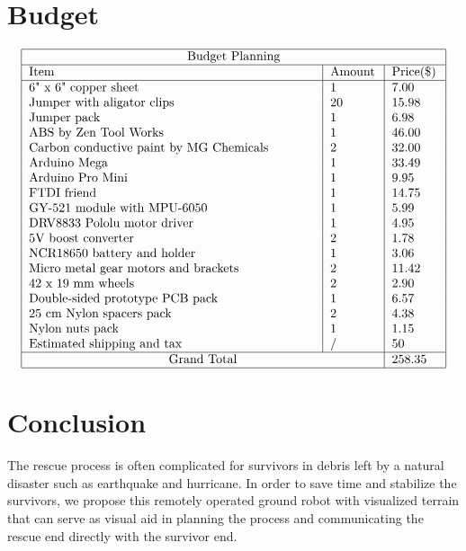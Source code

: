 \documentclass[a4paper,12pt]{article}
\begin{document}
\section{Budget}
$$
\begin{tabular}{ |p{8cm}|p{1.3cm}|p{1.3cm}|  }
	\hline
		\multicolumn{3}{|c|}{Budget Planning} \\
	\hline
		 Item & Amount & Price(\$) \\
	\hline
		 6" x 6" copper sheet					& 	1	&	7.00\\
		 Jumper with aligator clips				&	20	&	15.98\\
		 Jumper	pack								&	1	&	6.98\\
		 ABS by Zen Tool Works					&	1	&	46.00\\
		 Carbon conductive paint by MG Chemicals	&	2	&	32.00\\
		 Arduino Mega							&	1	&	33.49\\
		 Arduino Pro Mini						&	1	&	9.95\\
		 FTDI friend								&	1	&	14.75\\
		 GY-521 module with MPU-6050				&	1	&	5.99\\
		 DRV8833 Pololu motor driver				&	1	&	4.95\\
		 5V boost converter						&	2	&	1.78\\
		 NCR18650 battery and holder				&	1	&	3.06\\
		 Micro metal gear motors and brackets	&	2	&	11.42\\
		 42 x 19 mm wheels						&	2	&	2.90\\
		 Double-sided prototype PCB pack			&	1	&	6.57\\
		 25 cm Nylon spacers pack					&	2	&	4.38\\
		 Nylon nuts pack							&	1	&	1.15\\
		 Estimated shipping and tax				&	/	&	50\\
	\hline
		\multicolumn{2}{|c|}{Grand Total}	& 258.35\\
	\hline
\end{tabular}
$$

\section{Conclusion}
The rescue process is often complicated for survivors in debris left by a natural disaster such as earthquake and hurricane. In order to save time and stabilize the survivors, we propose this remotely operated ground robot with visualized terrain that can serve as visual aid in planning the process and communicating the rescue end directly with the survivor end.



\medskip



\end{document}

